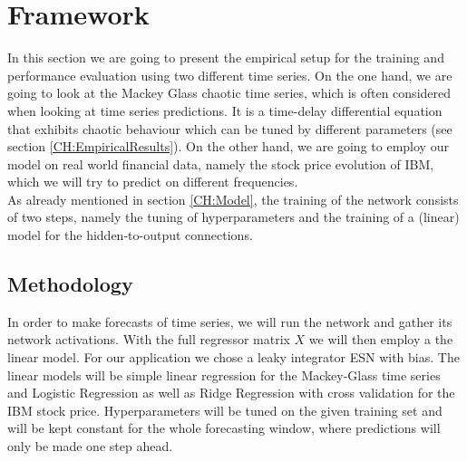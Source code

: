 \section{Framework}
\label{CH:Framework}



In this section we are going to present the empirical setup for the training and performance evaluation using two different time series. On the one hand, we are going to look at the Mackey Glass chaotic time series, which is often considered when looking at time series predictions. It is a time-delay differential equation that exhibits chaotic behaviour which can be tuned by different parameters (see section \ref{CH:EmpiricalResults}). On the other hand, we are going to employ our model on real world financial data, namely the stock price evolution of IBM, which we will try to predict on different frequencies.\\ 
As already mentioned in section \ref{CH:Model}, the training of the network consists of two steps, namely the tuning of hyperparameters and the training of a (linear) model for the hidden-to-output connections.

\subsection{Methodology}

In order to make forecasts of time series, we will run the network and gather its network activations. With the full regressor matrix $X$ we will then employ a the linear model. For our application we chose a leaky integrator ESN with bias. The linear models will be simple linear regression for the Mackey-Glass time series and Logistic Regression as well as Ridge Regression with cross validation for the IBM stock price. Hyperparameters will be tuned on the given training set and will be kept constant for the whole forecasting window, where predictions will only be made one step ahead.


